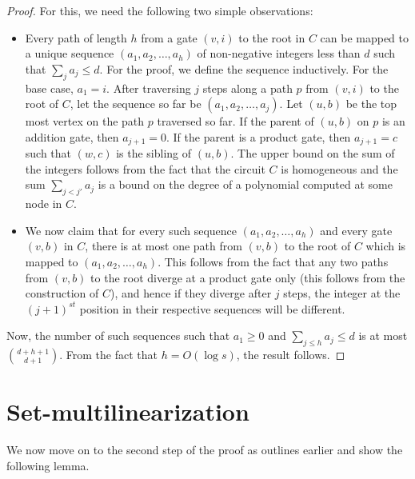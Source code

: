 \begin{proof}
For this, we need the following two simple observations:
\begin{itemize}
\item Every path of length $h$ from a gate $(v, i)$ to the root in $C$
  can be mapped to a unique sequence $(a_1, a_2, \ldots, a_h)$ of non-negative integers less than $d$ such that $\sum_j a_j \leq d$.
For the proof, we define the sequence inductively.
For the base case, $a_1 = i$.
After traversing $j$ steps along a path $p$ from $(v,i)$ to the root of $C$, let the sequence so far be $(a_1, a_2, \ldots, a_j)$.
Let $(u, b)$ be the top most vertex on the path $p$ traversed so far.
If the parent of $(u, b)$ on $p$ is an addition gate, then $a_{j+1} = 0$.
If the parent is a product gate, then $a_{j+1} = c$ such that $(w,c)$ is the sibling of $(u,b)$.
The upper bound on the sum of the integers follows from the fact that the circuit $C$ is homogeneous and the sum $\sum_{j<j'} a_j$ is a bound on the degree of a polynomial computed at some node in $C$.

\item We now claim that for every such sequence $(a_1, a_2, \ldots,
  a_h)$ and every gate $(v,b)$ in $C$, there is at most one path from $(v,b)$ to the root of $C$ which is mapped to $(a_1, a_2, \ldots, a_h)$.
This follows from the fact that any two paths from $(v,b)$ to the root diverge at a product gate only (this follows from the construction of $C$), and hence if they diverge after $j$ steps, the integer at the $(j+1)^{st}$ position in their respective sequences will be different.
\end{itemize}

Now, the number of such sequences such that $a_1 \geq 0$ and $\sum_{j \leq h}a_j \leq d$ is at most ${d + h + 1\choose d+1}$.
From the fact that $h = O(\log s)$, the result follows.
\end{proof}

\section{Set-multilinearization}
We now move on to the second step of the proof as outlines earlier and show the following lemma. 

